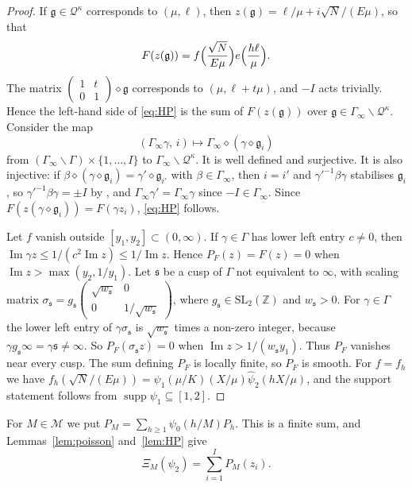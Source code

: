 \documentclass[11pt]{amsart}
\theoremstyle{remark}
\theoremstyle{definition}
\numberwithin{equation}{section}
\newcommand{\Qc}{\mathcal{Q}}
\newcommand{\Mset}{\mathcal{M}}
\newcommand{\Z}{\mathbb{Z}}
\newcommand{\fg}{\mathfrak{g}}
\newcommand{\gs}{\mathfrak{s}}
\newcommand{\SL}{\mathrm{SL}}
\begin{document}
\begin{proof}
If $\fg\in\Qc^\kappa$ corresponds to $(\mu,\ell)$, then $z(\fg)=\ell/\mu+i\sqrt N/(E\mu)$, so that
\[
F(z(\fg))=f\Bigl(\frac{\sqrt N}{E\mu}\Bigr)e\Bigl(\frac{h\ell}\mu\Bigr).
\]
The matrix $\left(\begin{smallmatrix}1&t\\0&1\end{smallmatrix}\right)\diamond\fg$ corresponds to $(\mu,\ell+t\mu)$, and $-I$ acts trivially. Hence the left-hand side of \eqref{eq:HP} is the sum of $F(z(\fg))$ over $\fg\in\Gamma_\infty\backslash\Qc^\kappa$. Consider the map
\[
(\Gamma_\infty\gamma,\,i)\longmapsto\Gamma_\infty\diamond(\gamma\diamond\fg_i)
\]
from $(\Gamma_\infty\backslash\Gamma)\times\{1,\dots,I\}$ to $\Gamma_\infty\backslash\Qc^\kappa$. It is well defined and surjective. It is also injective: if $\beta\diamond(\gamma\diamond\fg_i)=\gamma'\diamond\fg_{i'}$ with $\beta\in\Gamma_\infty$, then $i=i'$ and $\gamma'^{-1}\beta\gamma$ stabilises $\fg_i$, so $\gamma'^{-1}\beta\gamma=\pm I$ by \cite[Lemma~6.2(a)]{II}, and $\Gamma_\infty\gamma'=\Gamma_\infty\gamma$ since $-I\in\Gamma_\infty$. Since $F(z(\gamma\diamond\fg_i))=F(\gamma z_i)$, \eqref{eq:HP} follows.

Let $f$ vanish outside $[y_1,y_2]\subset(0,\infty)$. If $\gamma\in\Gamma$ has lower left entry $c\ne0$, then $\operatorname{Im}\gamma z\le1/(c^2\operatorname{Im}z)\le1/\operatorname{Im}z$. Hence $P_F(z)=F(z)=0$ when $\operatorname{Im}z>\max(y_2,1/y_1)$. Let $\gs$ be a cusp of $\Gamma$ not equivalent to $\infty$, with scaling matrix $\sigma_\gs=g_\gs\left(\begin{smallmatrix}\sqrt{w_\gs}&0\\0&1/\sqrt{w_\gs}\end{smallmatrix}\right)$, where $g_\gs\in\SL_2(\Z)$ and $w_\gs>0$. For $\gamma\in\Gamma$ the lower left entry of $\gamma\sigma_\gs$ is $\sqrt{w_\gs}$ times a non-zero integer, because $\gamma g_\gs\infty=\gamma\gs\ne\infty$. So $P_F(\sigma_\gs z)=0$ when $\operatorname{Im}z>1/(w_\gs y_1)$. Thus $P_F$ vanishes near every cusp. The sum defining $P_F$ is locally finite, so $P_F$ is smooth. For $f=f_h$ we have $f_h(\sqrt N/(E\mu))=\psi_1(\mu/K)(X/\mu)\hat\psi_2(hX/\mu)$, and the support statement follows from $\operatorname{supp}\psi_1\subseteq[1,2]$.
\end{proof}

For $M\in\Mset$ we put $P_M=\sum_{h\ge1}\psi_0(h/M)P_h$. This is a finite sum, and Lemmas~\ref{lem:poisson} and~\ref{lem:HP} give
\begin{equation}\label{eq:XiM}
\Xi_M(\psi_2)=\sum_{i=1}^IP_M(z_i).
\end{equation}
\end{document}
